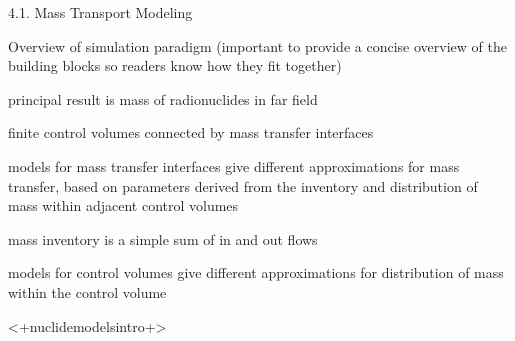 4.1. Mass Transport Modeling

 Overview of simulation paradigm (important to provide a concise overview of
 the building blocks so readers know how they fit together)

 principal result is mass of radionuclides in far field

 finite control volumes connected by mass transfer interfaces

 models for mass transfer interfaces give different approximations for mass
 transfer, based on parameters derived from the inventory and distribution of
 mass within adjacent control volumes

 mass inventory is a simple sum of in and out flows

 models for control volumes give different approximations for distribution of
 mass within the control volume



<+nuclidemodelsintro+>
